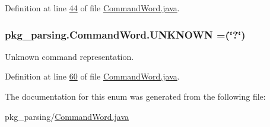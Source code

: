 Definition at line \hyperlink{CommandWord_8java_source_l00044}{44} of file \hyperlink{CommandWord_8java_source}{Command\-Word.\-java}.

\hypertarget{enumpkg__parsing_1_1CommandWord_a7a089aad12d2934da530b785a3daab49}{
\subsubsection[{U\-N\-K\-N\-O\-W\-N}]{\setlength{\rightskip}{0pt plus 5cm}pkg\-\_\-parsing.\-Command\-Word.\-U\-N\-K\-N\-O\-W\-N =(\char`\"{}?\char`\"{})}}\label{enumpkg__parsing_1_1CommandWord_a7a089aad12d2934da530b785a3daab49}
Unknown command representation. 

Definition at line \hyperlink{CommandWord_8java_source_l00060}{60} of file \hyperlink{CommandWord_8java_source}{Command\-Word.\-java}.



The documentation for this enum was generated from the following file\-:\begin{DoxyCompactItemize}
\item 
pkg\-\_\-parsing/\hyperlink{CommandWord_8java}{Command\-Word.\-java}\end{DoxyCompactItemize}
